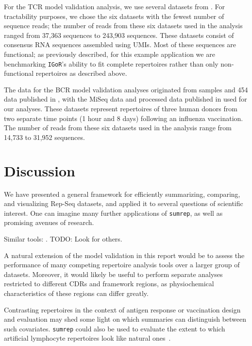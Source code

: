 \documentclass{article}
\newcommand{\igor}{\texttt{IGoR}}
\begin{document}
For the TCR model validation analysis, we use several datasets from \cite{Britanova2016-iw}.
For tractability purposes, we chose the six datasets with the fewest number of sequence reads; the number of reads from these six datasets used in the analysis ranged from 37,363 sequences to 243,903 sequences.
These datasets consist of consensus RNA sequences assembled using UMIs.
Most of these sequences are functional; as previously described, for this example application we are benchmarking \igor's ability to fit complete repertoires rather than only non-functional repertoires as described above.

The data for the BCR model validation analyses originated from samples and 454 data published in \cite{Laserson2014-dx}, with the MiSeq data and processed data published in \cite{Gupta2017-ve} used for our analyses.
These datasets represent repertoires of three human donors from two separate time points (1 hour and 8 days) following an influenza vaccination.
The number of reads from these six datasets used in the analysis range from 14,733 to 31,952 sequences.




\section*{Discussion}
We have presented a general framework for efficiently summarizing, comparing, and visualizing Rep-Seq datasets, and applied it to several questions of scientific interest.
One can imagine many further applications of \texttt{sumrep}, as well as promising avenues of research.

Similar tools: \cite{Nazarov2015-ok,Shugay2015-ur}.
TODO: Look for others.

A natural extension of the model validation in this report would be to assess the performance of many competing repertoire analysis tools over a larger group of datasets.
Moreover, it would likely be useful to perform separate analyses restricted to different CDRs and framework regions, as physiochemical characteristics of these regions can differ greatly.


Contrasting repertoires in the context of antigen response or vaccination design and evaluation may shed some light on which summaries can distinguish between such covariates.
\texttt{sumrep} could also be used to evaluate the extent to which artificial lymphocyte repertoires look like natural ones~\cite{Finlay2012}.
\end{document}
